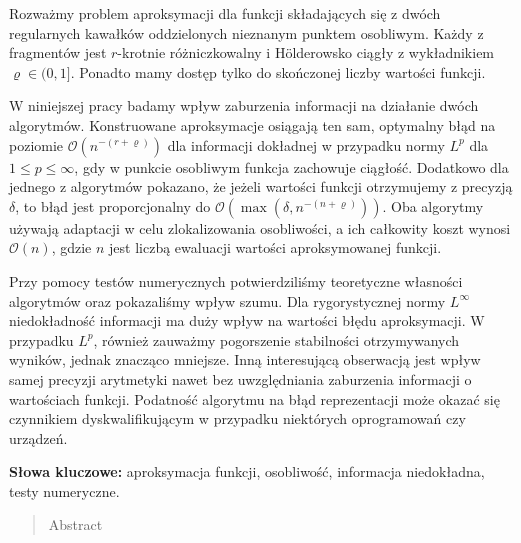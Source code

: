 \documentclass[oik, pdftex, man]{mgrwms}
\begin{document}
\begin{streszczenie}
    Rozważmy problem aproksymacji dla funkcji składających się z dwóch regularnych kawałków oddzielonych nieznanym punktem osobliwym. Każdy z fragmentów jest $r$-krotnie różniczkowalny i Hölderowsko ciągły z wykładnikiem $\varrho \in (0,1]$. Ponadto mamy dostęp tylko do skończonej liczby wartości funkcji. 
    
    W niniejszej pracy badamy wpływ zaburzenia informacji na działanie dwóch algorytmów. Konstruowane aproksymacje osiągają ten sam, optymalny błąd na poziomie $\mathcal{O}(n^{-(r+\varrho)})$ dla informacji dokładnej w przypadku normy $L^{p}$ dla $1 \leq p \leq \infty$, gdy w punkcie osobliwym funkcja zachowuje ciągłość. Dodatkowo dla jednego z algorytmów pokazano, że jeżeli wartości funkcji otrzymujemy z precyzją $\delta$, to błąd jest proporcjonalny do $\mathcal{O}(\max(\delta, n^{-(n+\varrho)}))$. Oba algorytmy używają adaptacji w celu zlokalizowania osobliwości, a ich całkowity koszt wynosi $\mathcal{O}(n)$, gdzie $n$ jest liczbą ewaluacji wartości aproksymowanej funkcji.

    Przy pomocy testów numerycznych potwierdziliśmy teoretyczne własności algorytmów oraz pokazaliśmy wpływ szumu. Dla rygorystycznej normy $L^{\infty}$ niedokładność informacji ma duży wpływ na wartości błędu aproksymacji. W przypadku $L^{p}$, również zauważmy pogorszenie stabilności otrzymywanych wyników, jednak znacząco mniejsze. Inną interesującą obserwacją jest wpływ samej precyzji arytmetyki nawet bez uwzględniania zaburzenia informacji o wartościach funkcji. Podatność algorytmu na błąd reprezentacji może okazać się czynnikiem dyskwalifikującym w przypadku niektórych oprogramowań czy urządzeń.

    \vspace{10pt}
    \textbf{Słowa kluczowe:} aproksymacja funkcji, osobliwość, informacja niedokładna, testy numeryczne.
    
\end{streszczenie}


\begin{abstract}
    Abstract
\end{abstract}


\end{document}
